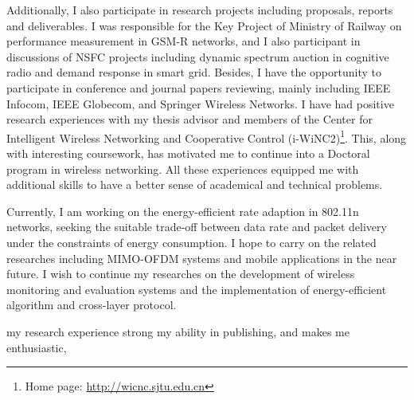 \documentclass[journal,onecolumn]{IEEEtran}
\begin{document}
Additionally, I also participate in research projects including proposals, reports and deliverables. I was responsible for the Key Project of Ministry of Railway on performance measurement in GSM-R networks, and I also participant in discussions of NSFC projects including dynamic spectrum auction in cognitive radio and demand response in smart grid. Besides, I have the opportunity to participate in conference and journal papers reviewing, mainly including IEEE Infocom, IEEE Globecom, and Springer Wireless Networks. I have had positive research experiences with my thesis advisor and members of the Center for Intelligent Wireless Networking and Cooperative Control (i-WiNC2)\footnote{Home page: \url{http://wicnc.sjtu.edu.cn}}. This, along with interesting coursework, has motivated me to continue into a Doctoral program in wireless networking. All these experiences equipped me with additional skills to have a better sense of academical and technical problems.

Currently, I am working on the energy-efficient rate adaption in 802.11n networks, seeking the suitable trade-off between data rate and packet delivery under the constraints of energy consumption. I hope to carry on the related researches including MIMO-OFDM systems and mobile applications in the near future. I wish to continue my researches on the development of wireless monitoring and evaluation systems and the implementation of energy-efficient algorithm and cross-layer protocol.

my research experience strong my ability in publishing, and makes me enthusiastic,
\end{document}
